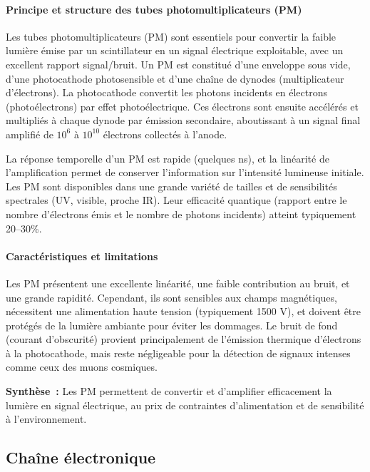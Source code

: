 \documentclass[a4paper,12pt,twoside]{article}
\begin{document}
\paragraph{Principe et structure des tubes photomultiplicateurs (PM)}
Les tubes photomultiplicateurs (PM) sont essentiels pour convertir la faible lumière émise par un scintillateur en un signal électrique exploitable, avec un excellent rapport signal/bruit. Un PM est constitué d'une enveloppe sous vide, d'une photocathode photosensible et d'une chaîne de dynodes (multiplicateur d'électrons). La photocathode convertit les photons incidents en électrons (photoélectrons) par effet photoélectrique. Ces électrons sont ensuite accélérés et multipliés à chaque dynode par émission secondaire, aboutissant à un signal final amplifié de $10^6$ à $10^{10}$ électrons collectés à l'anode.

La réponse temporelle d'un PM est rapide (quelques ns), et la linéarité de l'amplification permet de conserver l'information sur l'intensité lumineuse initiale. Les PM sont disponibles dans une grande variété de tailles et de sensibilités spectrales (UV, visible, proche IR). Leur efficacité quantique (rapport entre le nombre d'électrons émis et le nombre de photons incidents) atteint typiquement 20--30\%.

\paragraph{Caractéristiques et limitations}
Les PM présentent une excellente linéarité, une faible contribution au bruit, et une grande rapidité. Cependant, ils sont sensibles aux champs magnétiques, nécessitent une alimentation haute tension (typiquement 1500 V), et doivent être protégés de la lumière ambiante pour éviter les dommages. Le bruit de fond (courant d'obscurité) provient principalement de l'émission thermique d'électrons à la photocathode, mais reste négligeable pour la détection de signaux intenses comme ceux des muons cosmiques.

\begin{remarque}
\textbf{Synthèse~:} Les PM permettent de convertir et d’amplifier efficacement la lumière en signal électrique, au prix de contraintes d’alimentation et de sensibilité à l’environnement.
\end{remarque}

\subsection{Chaîne électronique}
\end{document}
